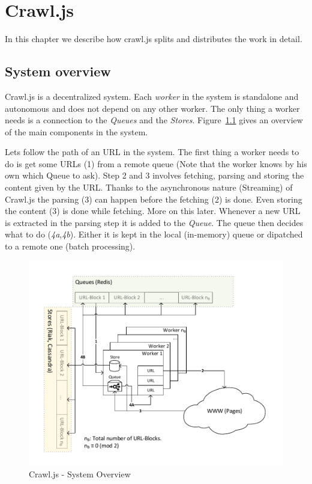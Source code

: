 
\chapter{Crawl.js} %
In this chapter we describe how crawl.js splits and distributes the work in detail.
\label{Chapter4} 

\section{System overview}
Crawl.js is a decentralized system. Each \emph{worker} in the system is standalone and autonomous and does not depend on any other worker. The only thing a worker needs is a connection to the \emph{Queues} and the \emph{Stores}. Figure~\ref{system_overview} gives an overview of the main components in the system.

Lets follow the path of an URL in the system.
The first thing a worker needs to do is get some URLs (1) from a remote queue (Note that the worker knows by his own which Queue to ask). Step 2 and 3 involves fetching, parsing and storing the content given by the URL. Thanks to the asynchronous nature (Streaming) of Crawl.js the parsing (3) can happen before the fetching (2) is done. Even storing the content (3) is done while fetching. More on this later. Whenever a new URL is extracted in the parsing step it is added to the \emph{Queue}. The queue then decides what to do (\emph{4a},\emph{4b}). Either it is kept in the local (in-memory) queue or dipatched to a remote one (batch processing).

\begin{figure}[h]
\centering
  \includegraphics[width=1\textwidth]{Figures/system_overview.pdf}
\caption{Crawl.js - System Overview}
\label{system_overview}
\end{figure}

